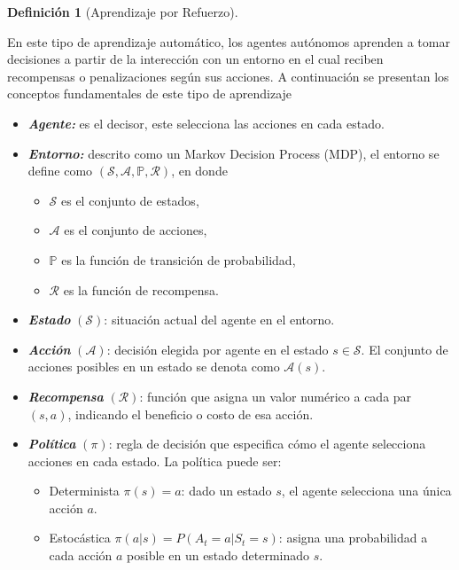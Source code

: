\documentclass[
  spanish,
  letterpaper,
]{scrreprt}
\providecommand{\tightlist}{%
  \setlength{\itemsep}{0pt}\setlength{\parskip}{0pt}}
\theoremstyle{definition}
\newtheorem{definition}{Definición}[chapter]
\theoremstyle{remark}
\begin{document}
\begin{definition}[Aprendizaje por
Refuerzo]\protect\hypertarget{def-sub}{}\label{def-sub}

En este tipo de aprendizaje automático, los agentes autónomos aprenden a
tomar decisiones a partir de la interección con un entorno en el cual
reciben recompensas o penalizaciones según sus acciones. A continuación
se presentan los conceptos fundamentales de este tipo de aprendizaje

\begin{itemize}
\item
  \textbf{\emph{Agente:}} es el decisor, este selecciona las acciones en
  cada estado.
\item
  \textbf{\emph{Entorno:}} descrito como un Markov Decision Process
  (MDP), el entorno se define como
  \((\mathcal{S}, \mathcal{A}, \mathbb{P}, \mathcal{R})\), en donde

  \begin{itemize}
  \tightlist
  \item
    \(\mathcal{S}\) es el conjunto de estados,
  \item
    \(\mathcal{A}\) es el conjunto de acciones,
  \item
    \(\mathbb{P}\) es la función de transición de probabilidad,\\
  \item
    \(\mathcal{R}\) es la función de recompensa.
  \end{itemize}
\item
  \textbf{\emph{Estado}} \((\mathcal{S})\): situación actual del agente
  en el entorno.
\item
  \textbf{\emph{Acción}} \((\mathcal{A})\): decisión elegida por agente
  en el estado \(s \in \mathcal{S}\). El conjunto de acciones posibles
  en un estado se denota como \(\mathcal{A}(s)\).
\item
  \textbf{\emph{Recompensa}} \((\mathcal{R})\): función que asigna un
  valor numérico a cada par \((s, a)\), indicando el beneficio o costo
  de esa acción.
\item
  \textbf{\emph{Política}} \((\pi)\): regla de decisión que especifica
  cómo el agente selecciona acciones en cada estado. La política puede
  ser:

  \begin{itemize}
  \tightlist
  \item
    Determinista \(\pi(s) = a\): dado un estado \(s\), el agente
    selecciona una única acción \(a\).
  \item
    Estocástica \(\pi(a|s) = P(A_t = a | S_t = s)\): asigna una
    probabilidad a cada acción \(a\) posible en un estado determinado
    \(s\).
  \end{itemize}
\end{itemize}


\end{definition}
\end{document}
